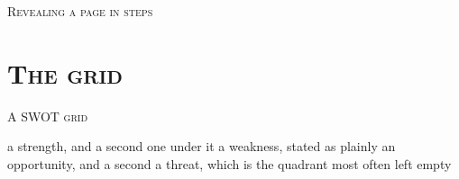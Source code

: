 \documentclass[xcolor=dvipsnames, aspectratio=1610]{beamer}
\begin{document}
\begin{frame}{\textsc{Revealing a page in steps}}

  \begin{itemize}
  \end{itemize}


\end{frame}

\section{\textsc{The grid}}

\begin{frame}{\textsc{A SWOT grid}}

  \swot
    {\scriptsize a strength, and a second one under it}
    {\scriptsize a weakness, stated as plainly}
    {\scriptsize an opportunity, and a second}
    {\scriptsize a threat, which is the quadrant most often left empty}

\end{frame}
\end{document}
